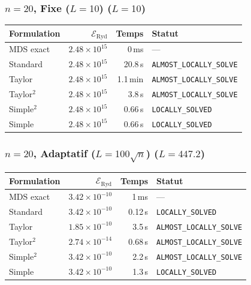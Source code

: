 \subsubsection{$n=20$, Fixe ($L{=}10$) ($L=10$)}
\begin{longtable}{@{}lrrl@{}}
  \toprule
  Formulation & $\mathcal{E}_{\mathrm{Ryd}}$ & Temps & Statut \\
  \midrule
  \endhead
  MDS exact & $2.48\times10^{15}$ & 0\,ms & --- \\
  Standard & $2.48\times10^{15}$ & 20.8\,s & \texttt{ALMOST\_LOCALLY\_SOLVE} \\
  Taylor & $2.48\times10^{15}$ & 1.1\,min & \texttt{ALMOST\_LOCALLY\_SOLVE} \\
  Taylor$^2$ & $2.48\times10^{15}$ & 3.8\,s & \texttt{ALMOST\_LOCALLY\_SOLVE} \\
  Simple$^2$ & $2.48\times10^{15}$ & 0.66\,s & \texttt{LOCALLY\_SOLVED} \\
  Simple & $2.48\times10^{15}$ & 0.66\,s & \texttt{LOCALLY\_SOLVED} \\
  \bottomrule
\end{longtable}

\subsubsection{$n=20$, Adaptatif ($L{=}100\sqrt{n}$) ($L=447.2$)}
\begin{longtable}{@{}lrrl@{}}
  \toprule
  Formulation & $\mathcal{E}_{\mathrm{Ryd}}$ & Temps & Statut \\
  \midrule
  \endhead
  MDS exact & $3.42\times10^{-10}$ & 1\,ms & --- \\
  Standard & $3.42\times10^{-10}$ & 0.12\,s & \texttt{LOCALLY\_SOLVED} \\
  Taylor & $1.85\times10^{-10}$ & 3.5\,s & \texttt{ALMOST\_LOCALLY\_SOLVE} \\
  Taylor$^2$ & $2.74\times10^{-14}$ & 0.68\,s & \texttt{ALMOST\_LOCALLY\_SOLVE} \\
  Simple$^2$ & $3.42\times10^{-10}$ & 2.2\,s & \texttt{ALMOST\_LOCALLY\_SOLVE} \\
  Simple & $3.42\times10^{-10}$ & 1.3\,s & \texttt{LOCALLY\_SOLVED} \\
  \bottomrule
\end{longtable}

